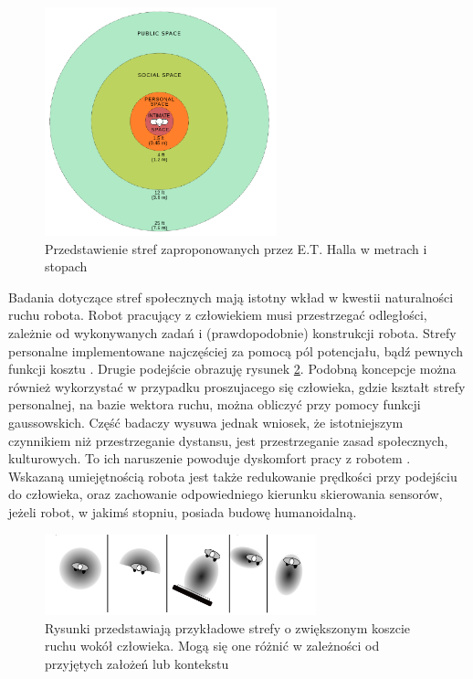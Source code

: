 \begin{figure}[h]
	\centering
	\includegraphics[width=0.6\textwidth]{gfx/882px-Personal_Space.png}
	\caption{Przedstawienie stref zaproponowanych przez E.T. Halla w metrach i stopach\cite{dimension_zones}}
	\label{fig:hall_zones}
\end{figure}

Badania dotyczące stref społecznych mają istotny wkład w kwestii naturalności ruchu robota. Robot pracujący z człowiekiem musi przestrzegać odległości, zależnie od wykonywanych zadań i (prawdopodobnie) konstrukcji robota. Strefy personalne implementowane najczęściej za pomocą pól potencjału, bądź pewnych funkcji kosztu \cite{survey}. Drugie podejście obrazuję rysunek \ref{fig:cost_zones}. Podobną koncepcje można również wykorzystać w przypadku proszujacego się człowieka, gdzie kształt strefy personalnej, na bazie wektora ruchu, można obliczyć przy pomocy funkcji gaussowskich\cite{nrs}. Część badaczy wysuwa jednak wniosek, że istotniejszym czynnikiem niż przestrzeganie dystansu, jest przestrzeganie zasad społecznych, kulturowych. To ich naruszenie powoduje dyskomfort pracy z robotem \cite{survey}\cite{survey_2}. Wskazaną umiejętnością robota jest także redukowanie prędkości przy podejściu do człowieka, oraz zachowanie odpowiedniego kierunku skierowania sensorów, jeżeli robot, w jakimś stopniu, posiada budowę humanoidalną.

\begin{figure}[H]
	\centering
	\includegraphics[width=0.7\textwidth]{gfx/cost_zone.png}
	\caption{Rysunki przedstawiają przykładowe strefy o zwiększonym koszcie ruchu wokół człowieka. Mogą się one różnić w zależności od przyjętych założeń lub kontekstu\cite{survey}}
	\label{fig:cost_zones}
\end{figure}

